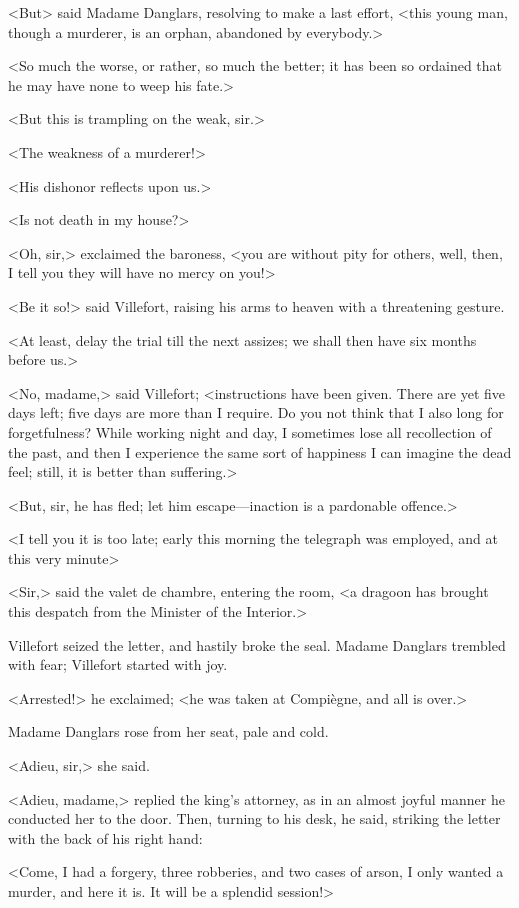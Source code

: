  <But> said Madame Danglars, resolving to make a last effort, <this young man, though a murderer, is an orphan, abandoned by everybody.> 

 <So much the worse, or rather, so much the better; it has been so ordained that he may have none to weep his fate.> 

 <But this is trampling on the weak, sir.> 

 <The weakness of a murderer!> 

 <His dishonor reflects upon us.> 

 <Is not death in my house?> 

 <Oh, sir,> exclaimed the baroness, <you are without pity for others, well, then, I tell you they will have no mercy on you!> 

 <Be it so!> said Villefort, raising his arms to heaven with a threatening gesture. 

 <At least, delay the trial till the next assizes; we shall then have six months before us.> 

 <No, madame,> said Villefort; <instructions have been given. There are yet five days left; five days are more than I require. Do you not think that I also long for forgetfulness? While working night and day, I sometimes lose all recollection of the past, and then I experience the same sort of happiness I can imagine the dead feel; still, it is better than suffering.> 

 <But, sir, he has fled; let him escape—inaction is a pardonable offence.> 

 <I tell you it is too late; early this morning the telegraph was employed, and at this very minute\longdash> 

 <Sir,> said the valet de chambre, entering the room, <a dragoon has brought this despatch from the Minister of the Interior.> 

 Villefort seized the letter, and hastily broke the seal. Madame Danglars trembled with fear; Villefort started with joy. 

 <Arrested!> he exclaimed; <he was taken at Compiègne, and all is over.> 

 Madame Danglars rose from her seat, pale and cold. 

 <Adieu, sir,> she said. 

 <Adieu, madame,> replied the king's attorney, as in an almost joyful manner he conducted her to the door. Then, turning to his desk, he said, striking the letter with the back of his right hand: 

 <Come, I had a forgery, three robberies, and two cases of arson, I only wanted a murder, and here it is. It will be a splendid session!> 